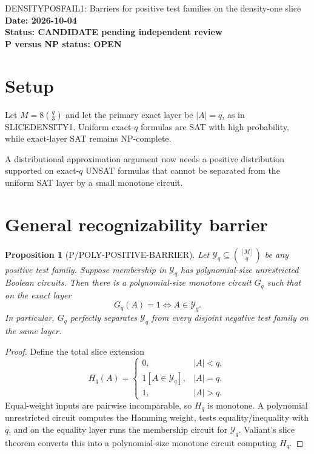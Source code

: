 \documentclass[11pt]{article}
\newtheorem{proposition}{Proposition}
\begin{document}
\begin{center}
{\Large DENSITYPOSFAIL1: Barriers for positive test families on the density-one slice}\\[4pt]
\textbf{Date: 2026-10-04}\\
\textbf{Status: CANDIDATE pending independent review}\\
\textbf{P versus NP status: OPEN}
\end{center}

\section{Setup}
Let \(M=8\binom q3\) and let the primary exact layer be \(|A|=q\), as in SLICEDENSITY1. Uniform exact-\(q\) formulas are SAT with high probability, while exact-layer SAT remains NP-complete.

A distributional approximation argument now needs a positive distribution supported on exact-\(q\) UNSAT formulas that cannot be separated from the uniform SAT layer by a small monotone circuit.

\section{General recognizability barrier}

\begin{proposition}[P/POLY-POSITIVE-BARRIER]
Let \(\mathcal Y_q\subseteq\binom{[M]}q\) be any positive test family. Suppose membership in \(\mathcal Y_q\) has polynomial-size unrestricted Boolean circuits. Then there is a polynomial-size monotone circuit \(G_q\) such that on the exact layer
\[
G_q(A)=1\iff A\in\mathcal Y_q.
\]
In particular, \(G_q\) perfectly separates \(\mathcal Y_q\) from every disjoint negative test family on the same layer.
\end{proposition}

\begin{proof}
Define the total slice extension
\[
H_q(A)=
\begin{cases}
0,&|A|<q,\\
1[A\in\mathcal Y_q],&|A|=q,\\
1,&|A|>q.
\end{cases}
\]
Equal-weight inputs are pairwise incomparable, so \(H_q\) is monotone. A polynomial unrestricted circuit computes the Hamming weight, tests equality/inequality with \(q\), and on the equality layer runs the membership circuit for \(\mathcal Y_q\). Valiant's slice theorem converts this into a polynomial-size monotone circuit computing \(H_q\).
\end{proof}
\end{document}
